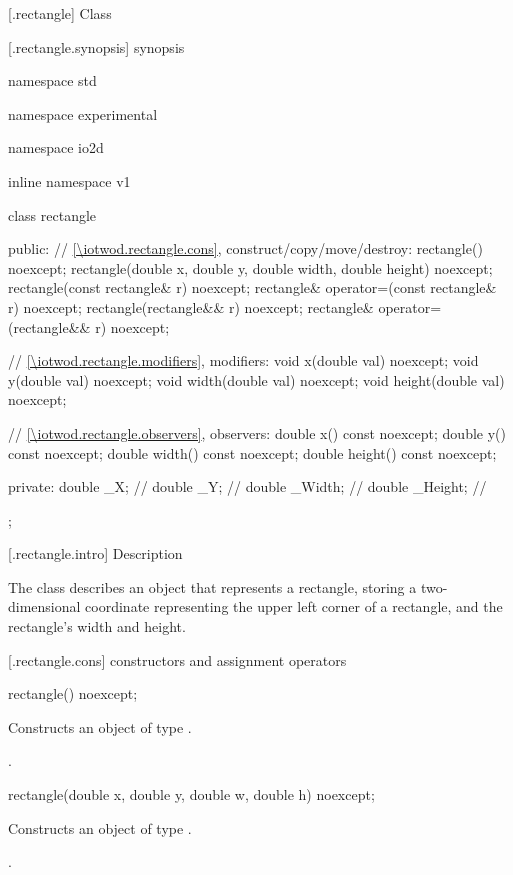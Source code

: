  [\iotwod.rectangle] {Class }

 [\iotwod.rectangle.synopsis] { synopsis}

\begin{codeblock}
namespace std { namespace experimental { namespace io2d { inline namespace v1 {
  class rectangle {
  public:
    // \ref{\iotwod.rectangle.cons}, construct/copy/move/destroy:
    rectangle() noexcept;
    rectangle(double x, double y, double width, double height) noexcept;
    rectangle(const rectangle& r) noexcept;
    rectangle& operator=(const rectangle& r) noexcept;
    rectangle(rectangle&& r) noexcept;
    rectangle& operator=(rectangle&& r) noexcept;

    // \ref{\iotwod.rectangle.modifiers}, modifiers:
    void x(double val) noexcept;
    void y(double val) noexcept;
    void width(double val) noexcept;
    void height(double val) noexcept;
    
    // \ref{\iotwod.rectangle.observers}, observers:
    double x() const noexcept;
    double y() const noexcept;
    double width() const noexcept;
    double height() const noexcept;
    
  private:
    double _X;      // \expos
    double _Y;      // \expos
    double _Width;  // \expos
    double _Height; // \expos
  };
} } } }
\end{codeblock}

 [\iotwod.rectangle.intro] { Description}

\pnum
{}%
The class  describes an object that represents a rectangle, storing a two-dimensional coordinate representing the upper left corner of a rectangle, and the rectangle's width and height.

 [\iotwod.rectangle.cons] { constructors and assignment operators}

\begin{itemdecl}
rectangle() noexcept;
\end{itemdecl}
\begin{itemdescr}
	\pnum
	\effects
	Constructs an object of type .
	
	\pnum
	\postconditions
	.
\end{itemdescr}

\begin{itemdecl}
rectangle(double x, double y, double w, double h) noexcept;
\end{itemdecl}
\begin{itemdescr}
	\pnum
	\effects
	Constructs an object of type .
	
	\pnum
	\postconditions
	.
\end{itemdescr}

